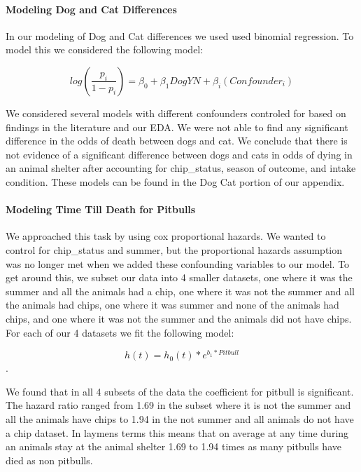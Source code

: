 \documentclass[]{article}
\let\oldparagraph\paragraph
\renewcommand{\paragraph}[1]{\oldparagraph{#1}\mbox{}}
\begin{document}
\paragraph{Modeling Dog and Cat
Differences}\label{modeling-dog-and-cat-differences}

In our modeling of Dog and Cat differences we used used binomial
regression. To model this we considered the following model:

\[log(\frac{p_{i}}{1-p_{i}})=\beta_0+\beta_1 DogYN + \beta_i(Confounder_i)\]

We considered several models with different confounders controled for
based on findings in the literature and our EDA. We were not able to
find any significant difference in the odds of death between dogs and
cat. We conclude that there is not evidence of a significant difference
between dogs and cats in odds of dying in an animal shelter after
accounting for chip\_status, season of outcome, and intake condition.
These models can be found in the Dog Cat portion of our appendix.

\paragraph{Modeling Time Till Death for
Pitbulls}\label{modeling-time-till-death-for-pitbulls}

We approached this task by using cox proportional hazards. We wanted to
control for chip\_status and summer, but the proportional hazards
assumption was no longer met when we added these confounding variables
to our model. To get around this, we subset our data into 4 smaller
datasets, one where it was the summer and all the animals had a chip,
one where it was not the summer and all the animals had chips, one where
it was summer and none of the animals had chips, and one where it was
not the summer and the animals did not have chips. For each of our 4
datasets we fit the following model:

\[h(t)=h_0(t)*e^{b_1*Pitbull}\].

We found that in all 4 subsets of the data the coefficient for pitbull
is significant. The hazard ratio ranged from 1.69 in the subset where it
is not the summer and all the animals have chips to 1.94 in the not
summer and all animals do not have a chip dataset. In laymens terms this
means that on average at any time during an animals stay at the animal
shelter 1.69 to 1.94 times as many pitbulls have died as non pitbulls.
\end{document}
